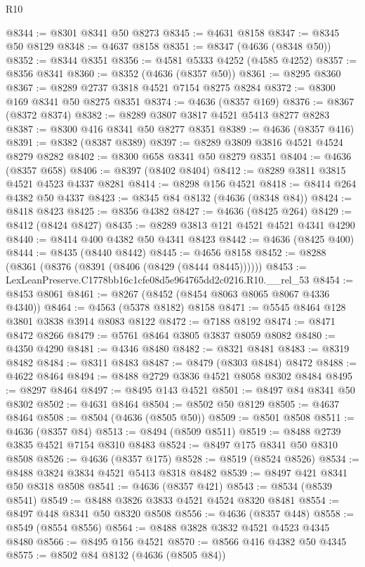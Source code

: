 \begin{lexlean}{R10}
\begin{coremodule}
@8344 := @8301 @8341 @50 @8273
@8345 := @4631 @8158
@8347 := @8345 @50 @8129
@8348 := @4637 @8158
@8351 := @8347 (@4636 (@8348 @50))
@8352 := @8344 @8351
@8356 := @4581 @5333 @4252 (@4585 @4252)
@8357 := @8356 @8341
@8360 := @8352 (@4636 (@8357 @50))
@8361 := @8295 @8360
@8367 := @8289 @2737 @3818 @4521 @7154 @8275 @8284
@8372 := @8300 @169 @8341 @50 @8275 @8351
@8374 := @4636 (@8357 @169)
@8376 := @8367 (@8372 @8374)
@8382 := @8289 @3807 @3817 @4521 @5413 @8277 @8283
@8387 := @8300 @416 @8341 @50 @8277 @8351
@8389 := @4636 (@8357 @416)
@8391 := @8382 (@8387 @8389)
@8397 := @8289 @3809 @3816 @4521 @4524 @8279 @8282
@8402 := @8300 @658 @8341 @50 @8279 @8351
@8404 := @4636 (@8357 @658)
@8406 := @8397 (@8402 @8404)
@8412 := @8289 @3811 @3815 @4521 @4523 @4337 @8281
@8414 := @8298 @156 @4521
@8418 := @8414 @264 @4382 @50 @4337
@8423 := @8345 @84 @8132 (@4636 (@8348 @84))
@8424 := @8418 @8423
@8425 := @8356 @4382
@8427 := @4636 (@8425 @264)
@8429 := @8412 (@8424 @8427)
@8435 := @8289 @3813 @121 @4521 @4521 @4341 @4290
@8440 := @8414 @400 @4382 @50 @4341 @8423
@8442 := @4636 (@8425 @400)
@8444 := @8435 (@8440 @8442)
@8445 := @4656 @8158
@8452 := @8288 (@8361 (@8376 (@8391 (@8406 (@8429 (@8444 @8445))))))
@8453 := LexLeanPreserve.C1778bb16c1cfe08d5e964765dd2c0216.R10.__rel_53
@8454 := @8453 @8061
@8461 := @8267 (@8452 (@8454 @8063 @8065 @8067 @4336 @4340))
@8464 := @4563 (@5378 @8182) @8158
@8471 := @5545 @8464 @128 @3801 @3838 @3914 @8083 @8122
@8472 := @7188 @8192
@8474 := @8471 @8472 @8266
@8479 := @5761 @8464 @3805 @3837 @8059 @8082
@8480 := @4350 @4290
@8481 := @4346 @8480
@8482 := @8321 @8481
@8483 := @8319 @8482
@8484 := @8311 @8483
@8487 := @8479 (@8303 @8484) @8472
@8488 := @4622 @8464
@8494 := @8488 @2729 @3836 @4521 @8058 @8302 @8484
@8495 := @8297 @8464
@8497 := @8495 @143 @4521
@8501 := @8497 @84 @8341 @50 @8302
@8502 := @4631 @8464
@8504 := @8502 @50 @8129
@8505 := @4637 @8464
@8508 := @8504 (@4636 (@8505 @50))
@8509 := @8501 @8508
@8511 := @4636 (@8357 @84)
@8513 := @8494 (@8509 @8511)
@8519 := @8488 @2739 @3835 @4521 @7154 @8310 @8483
@8524 := @8497 @175 @8341 @50 @8310 @8508
@8526 := @4636 (@8357 @175)
@8528 := @8519 (@8524 @8526)
@8534 := @8488 @3824 @3834 @4521 @5413 @8318 @8482
@8539 := @8497 @421 @8341 @50 @8318 @8508
@8541 := @4636 (@8357 @421)
@8543 := @8534 (@8539 @8541)
@8549 := @8488 @3826 @3833 @4521 @4524 @8320 @8481
@8554 := @8497 @448 @8341 @50 @8320 @8508
@8556 := @4636 (@8357 @448)
@8558 := @8549 (@8554 @8556)
@8564 := @8488 @3828 @3832 @4521 @4523 @4345 @8480
@8566 := @8495 @156 @4521
@8570 := @8566 @416 @4382 @50 @4345
@8575 := @8502 @84 @8132 (@4636 (@8505 @84))

\end{coremodule}
\end{lexlean}
